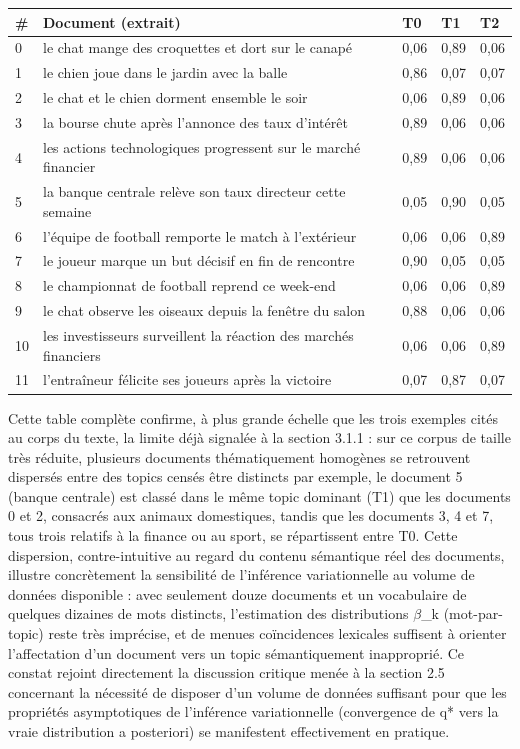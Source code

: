 \begin{table}[H]
\centering
\small
\setlength{\tabcolsep}{0.14cm}
\begin{tabular}{|p{2.77cm}|p{2.77cm}|p{2.77cm}|p{2.77cm}|p{2.77cm}|}
\hline
\textbf{\#} & \textbf{Document (extrait)} & \textbf{T0} & \textbf{T1} & \textbf{T2} \\
\hline
0 & le chat mange des croquettes et dort sur le canapé & 0,06 & 0,89 & 0,06 \\
\hline
1 & le chien joue dans le jardin avec la balle & 0,86 & 0,07 & 0,07 \\
\hline
2 & le chat et le chien dorment ensemble le soir & 0,06 & 0,89 & 0,06 \\
\hline
3 & la bourse chute après l'annonce des taux d'intérêt & 0,89 & 0,06 & 0,06 \\
\hline
4 & les actions technologiques progressent sur le marché financier & 0,89 & 0,06 & 0,06 \\
\hline
5 & la banque centrale relève son taux directeur cette semaine & 0,05 & 0,90 & 0,05 \\
\hline
6 & l'équipe de football remporte le match à l'extérieur & 0,06 & 0,06 & 0,89 \\
\hline
7 & le joueur marque un but décisif en fin de rencontre & 0,90 & 0,05 & 0,05 \\
\hline
8 & le championnat de football reprend ce week-end & 0,06 & 0,06 & 0,89 \\
\hline
9 & le chat observe les oiseaux depuis la fenêtre du salon & 0,88 & 0,06 & 0,06 \\
\hline
10 & les investisseurs surveillent la réaction des marchés financiers & 0,06 & 0,06 & 0,89 \\
\hline
11 & l'entraîneur félicite ses joueurs après la victoire & 0,07 & 0,87 & 0,07 \\
\hline
\end{tabular}
\end{table}
Cette table complète confirme, à plus grande échelle que les trois exemples cités au corps du texte, la limite déjà signalée à la section 3.1.1 : sur ce corpus de taille très réduite, plusieurs documents thématiquement homogènes se retrouvent dispersés entre des topics censés être distincts  par exemple, le document 5 (banque centrale) est classé dans le même topic dominant (T1) que les documents 0 et 2, consacrés aux animaux domestiques, tandis que les documents 3, 4 et 7, tous trois relatifs à la finance ou au sport, se répartissent entre T0. Cette dispersion, contre-intuitive au regard du contenu sémantique réel des documents, illustre concrètement la sensibilité de l'inférence variationnelle au volume de données disponible : avec seulement douze documents et un vocabulaire de quelques dizaines de mots distincts, l'estimation des distributions $\beta $\_k (mot-par-topic) reste très imprécise, et de menues coïncidences lexicales suffisent à orienter l'affectation d'un document vers un topic sémantiquement inapproprié. Ce constat rejoint directement la discussion critique menée à la section 2.5 concernant la nécessité de disposer d'un volume de données suffisant pour que les propriétés asymptotiques de l'inférence variationnelle (convergence de q* vers la vraie distribution a posteriori) se manifestent effectivement en pratique.

